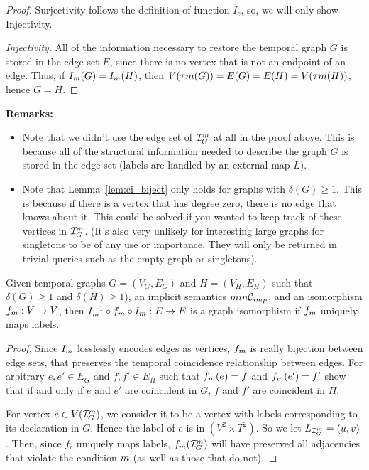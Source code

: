 \begin{proof}[Proof] Surjectivity follows the definition of function $I_c$, so,
  we will only show Injectivity.
  
  \textit{Injectivity}. All of the information necessary to restore the temporal
  graph $G$ is stored in the edge-set $E$, since there is no vertex that is not
  an endpoint of an edge. Thus, if $I_{m}(G) = I_{m}(H)$,
  then $V(\tau{m}(G)) = E(G) = E(H) = V(\tau{m}(H))$, hence
  $G = H$.
\end{proof}

\noindent \textbf{Remarks:}
\begin{itemize}
  \item Note that we didn't use the edge set of $\mathcal{I}_{G}^{m}$ at all in the
    proof above. This is because all of the structural information needed to
    describe the graph $G$ is stored in the edge set (labels are handled by an
    external map $L$).
  \item Note that Lemma~\ref{lem:ci_biject} only holds for graphs with
    $\delta(G) \geq 1$. This is because if there is a vertex that has degree
    zero, there is no edge that knows about it. This could be solved if you
    wanted to keep track of these vertices in $\mathcal{I}_{G}^{m}$. (It's also
    very unlikely for interesting large graphs for singletons to be of any use
    or importance. They will only be returned in trivial queries such as the
    empty graph or singletons).
\end{itemize}

\begin{corollary}
  Given temporal graphs $G = (V_G, E_G)$ and $H = (V_H, E_H)$ such that
  $\delta(G) \geq 1$ and $\delta(H) \geq 1)$, an implicit semantics $m in
  \mathcal{C}_{imp}$, and an isomorphism $f_m : V \to V$, then $I_{m}^{-1}
  \circ f_{m} \circ I_{m} : E \to E$ is a graph isomorphism if
  $f_{m}$ uniquely maps labels.
\end{corollary}

\begin{proof}
  Since $I_{m}$ losslessly encodes edges as vertices, $f_{m}$
  is really bijection between edge sets, that preserves the temporal coincidence
  relationship between edges.  For arbitrary $e,e' \in E_G$ and $f,f'\in E_H$
  such that $f_{m}(e) = f$ and $f_{m}(e') = f'$ show that if and
  only if $e$ and $e'$ are coincident in $G$, $f$ and $f'$ are coincident in
  $H$.

  For vertex $e \in V(\mathcal{I}_{G}^{m})$, we consider it to be a vertex with
  labels corresponding to its declaration in $G$. Hence the label of $e$ is in
  $(V^2 \times T^2)$. So we let $L_{\mathcal{I}_{G}^{m}} = \left(u, v
  \right)$. Then, since $f_c$ uniquely maps labels,
  $f_{m}(\mathcal{I}_{G}^{m})$ will have preserved all adjacencies that
  violate the condition $m$ (as well as those that do not).
\end{proof}

